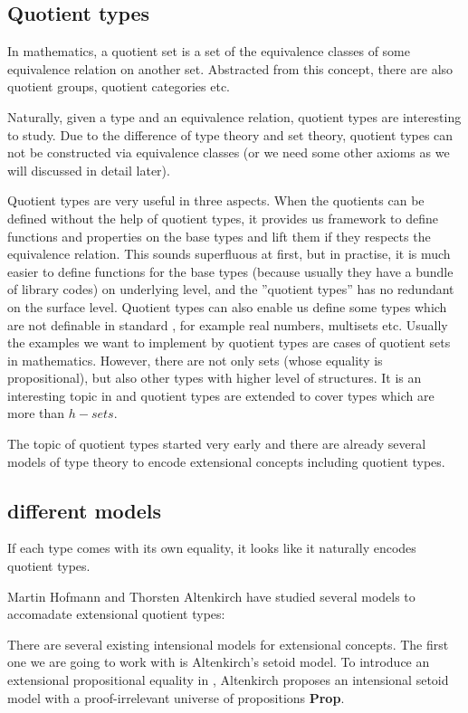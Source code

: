 \subsection{Quotient types}


In mathematics, a quotient set is a set of the equivalence classes of
some equivalence relation on another set. Abstracted from this
concept, there are also quotient groups, quotient categories etc.

Naturally, given a type and an equivalence relation, quotient types
are interesting to study. Due to the difference of type theory and set
theory, quotient types can not be constructed via equivalence classes
(or we need some other axioms as we will discussed in detail
later).

Quotient types are very useful in three aspects. 
When the quotients
can be defined without the help of quotient types, it provides us
framework to define functions and properties on the base types and
lift them if they respects the equivalence relation. This sounds
superfluous at first, but in practise, it is much easier to define
functions for the base types (because usually they have a bundle of
library codes) on underlying level, and the ''quotient types'' has no
redundant on the surface level.
Quotient types can also enable us define some types which are not
definable in standard \itt, for example real numbers, multisets etc.
Usually the examples we want to implement by quotient types are cases
of quotient sets in mathematics. However, there are not only sets
(whose equality is propositional), but also other types with higher
level of structures. It is an interesting topic in \hott and quotient
types are extended to cover types which are more than $h-sets$.

The topic of quotient types started very early and there are already
several models of type theory to encode extensional concepts including
quotient types.

\subsection{different models}

If each type comes with its own equality, it looks like it naturally
encodes quotient types.

Martin Hofmann and Thorsten Altenkirch have studied several models to
accomadate extensional quotient types:

There are several existing intensional models for extensional
concepts. The first one we are going to work with is Altenkirch's
setoid model. To introduce an extensional propositional equality in \itt{}, 
Altenkirch \cite{alti:lics99} proposes an intensional setoid model
with a proof-irrelevant universe of propositions \textbf{Prop}.

